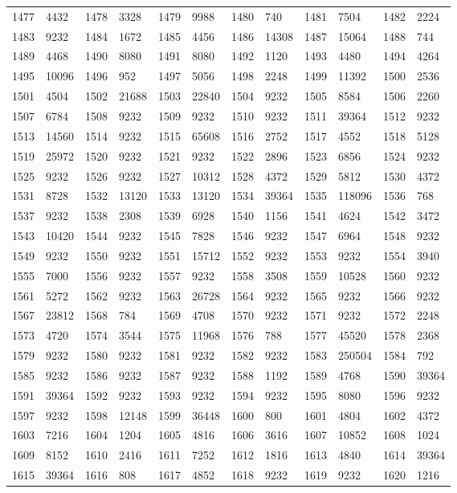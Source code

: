 \begin{longtable}{llllllllllll}
1477 & 4432&1478 &3328&1479& 9988&1480 &740&1481 &7504&1482& 2224\\
1483 & 9232&1484 &1672&1485& 4456&1486 &14308&1487 &15064&1488& 744\\
1489 & 4468&1490 &8080&1491& 8080&1492 &1120&1493 &4480&1494& 4264\\
1495 & 10096&1496 &952&1497& 5056&1498 &2248&1499 &11392&1500& 2536\\
1501 & 4504&1502 &21688&1503& 22840&1504 &9232&1505 &8584&1506& 2260\\
1507 & 6784&1508 &9232&1509& 9232&1510 &9232&1511 &39364&1512& 9232\\
1513 & 14560&1514 &9232&1515& 65608&1516 &2752&1517 &4552&1518& 5128\\
1519 & 25972&1520 &9232&1521& 9232&1522 &2896&1523 &6856&1524& 9232\\
1525 & 9232&1526 &9232&1527& 10312&1528 &4372&1529 &5812&1530& 4372\\
1531 & 8728&1532 &13120&1533& 13120&1534 &39364&1535 &118096&1536& 768\\
1537 & 9232&1538 &2308&1539& 6928&1540 &1156&1541 &4624&1542& 3472\\
1543 & 10420&1544 &9232&1545& 7828&1546 &9232&1547 &6964&1548& 9232\\
1549 & 9232&1550 &9232&1551& 15712&1552 &9232&1553 &9232&1554& 3940\\
1555 & 7000&1556 &9232&1557& 9232&1558 &3508&1559 &10528&1560& 9232\\
1561 & 5272&1562 &9232&1563& 26728&1564 &9232&1565 &9232&1566& 9232\\
1567 & 23812&1568 &784&1569& 4708&1570 &9232&1571 &9232&1572& 2248\\
1573 & 4720&1574 &3544&1575& 11968&1576 &788&1577 &45520&1578& 2368\\
1579 & 9232&1580 &9232&1581& 9232&1582 &9232&1583 &250504&1584& 792\\
1585 & 9232&1586 &9232&1587& 9232&1588 &1192&1589 &4768&1590& 39364\\
1591 & 39364&1592 &9232&1593& 9232&1594 &9232&1595 &8080&1596& 9232\\
1597 & 9232&1598 &12148&1599& 36448&1600 &800&1601 &4804&1602& 4372\\
1603 & 7216&1604 &1204&1605& 4816&1606 &3616&1607 &10852&1608& 1024\\
1609 & 8152&1610 &2416&1611& 7252&1612 &1816&1613 &4840&1614& 39364\\
1615 & 39364&1616 &808&1617& 4852&1618 &9232&1619 &9232&1620& 1216\\

\end{longtable}
